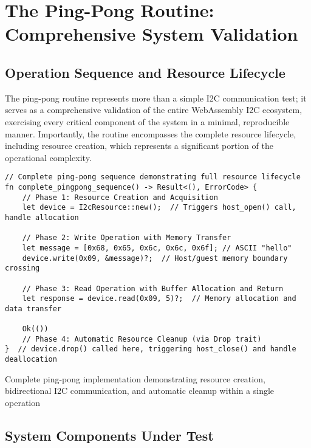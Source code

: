 \section{The Ping-Pong Routine: Comprehensive System Validation}
\label{sec:ping-pong-routine}

\subsection{Operation Sequence and Resource Lifecycle}

The ping-pong routine represents more than a simple I2C communication test; it serves as a comprehensive validation of the entire WebAssembly I2C ecosystem, exercising every critical component of the system in a minimal, reproducible manner. Importantly, the routine encompasses the complete resource lifecycle, including resource creation, which represents a significant portion of the operational complexity.

\begin{listing}[H]
\begin{verbatim}
// Complete ping-pong sequence demonstrating full resource lifecycle
fn complete_pingpong_sequence() -> Result<(), ErrorCode> {
    // Phase 1: Resource Creation and Acquisition
    let device = I2cResource::new();  // Triggers host_open() call, handle allocation
    
    // Phase 2: Write Operation with Memory Transfer
    let message = [0x68, 0x65, 0x6c, 0x6c, 0x6f]; // ASCII "hello"
    device.write(0x09, &message)?;  // Host/guest memory boundary crossing
    
    // Phase 3: Read Operation with Buffer Allocation and Return
    let response = device.read(0x09, 5)?;  // Memory allocation and data transfer
    
    Ok(())
    // Phase 4: Automatic Resource Cleanup (via Drop trait)
}  // device.drop() called here, triggering host_close() and handle deallocation
\end{verbatim}
\caption{Complete ping-pong implementation demonstrating resource creation, bidirectional I2C communication, and automatic cleanup within a single operation}
\label{lst:complete-pingpong}
\end{listing}

\subsection{System Components Under Test}

